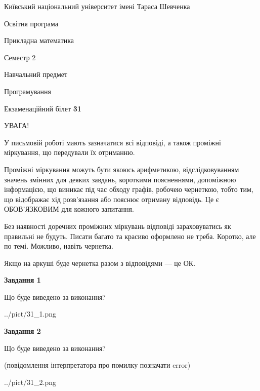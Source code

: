 \documentclass[12pt, ukrainian]{article}
\begin{document}
{{\begin {small}\par
{ \center  Київський національний університет імені Тараса Шевченка \par}
{\parbox {5 cm}{Освітня програма \hfill}{\parbox {7 cm}{Прикладна математика\hfill}}\parbox {6 cm}{\hfill Семестр 2}}\par
{\parbox {5 cm} {Навчальний предмет \hfill}\parbox {7 cm}{Програмування \hfill}\parbox {6cm}{\hfill}\par}\vspace{-7pt} \end{small}}{\center Екзаменаційний білет \No \textbf
{ 31 }\par}}
{
\begin {large}
УВАГА!

У письмовій роботі мають зазначатися всі відповіді, а також проміжні міркування, що передували їх отриманню.

Проміжні міркування можуть бути якоюсь арифметикою, відслідковуванням зна\-чень змінних для деяких завдань,
короткими поясненнями, допоміжною інформацією, що виникає під час обходу графів, робочею чернеткою,
тобто тим, що відображає хід розв’язання або пояснює отриману відповідь.
Це є ОБОВ’ЯЗКОВИМ для кожного запитання.

Без наявності доречних проміжних міркувань відповіді зараховуватись як правиль\-ні не будуть.
Писати багато та красиво оформлено не треба. Коротко, але по темі. Можли\-во, навіть чернетка.

Якщо на аркуші буде чернетка разом з відповідями --- це ОК.

\newpage

{\begin {center}\textbf{Завдання 1}\end {center}}\par
Що буде виведено за виконання?\par
\begin{center}
	{../pict/31_1.png}
\end{center}
\newpage

{\begin {center}\textbf{Завдання 2}\end {center}}\par
Що буде виведено за виконання?\par
 (повідомлення інтерпретатора про помилку позначати error)\par
\begin{center}
	{../pict/31_2.png}
\end{center}
\newpage


\end{large}}
\end{document}

